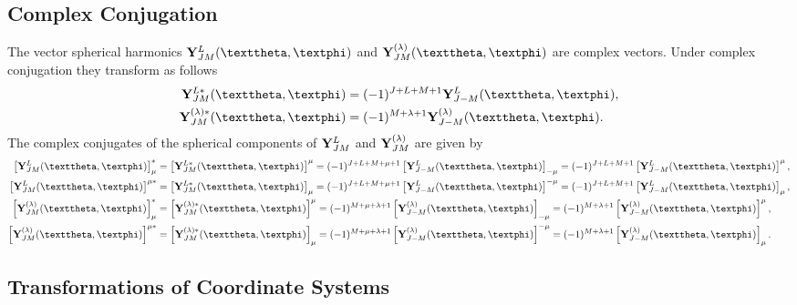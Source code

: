 \subsection{Complex Conjugation}\label{sec:7.3.3}
The vector spherical harmonics $\vect{Y}_{J M}^{L}(\vartheta, \varphi)$ and $\vect{Y}_{J M}^{(\lambda)}(\vartheta, \varphi)$ are complex vectors. Under complex conjugation they transform as follows
\begin{align}
\vect{Y}_{J M}^{L *}(\vartheta, \varphi) & =(-1)^{J+L+M+1} \vect{Y}_{J-M}^{L}(\vartheta, \varphi), \notag\\
\vect{Y}_{J M}^{(\lambda) *}(\vartheta, \varphi) & =(-1)^{M+\lambda+1} \vect{Y}_{J-M}^{(\lambda)}(\vartheta, \varphi). \label{eq:7:3:39}
\end{align}
The complex conjugates of the spherical components of $\mathbf{Y}_{J M}^{L}$ and $\mathbf{Y}_{J M}^{(\lambda)}$ are given by
\begin{align}
{\left[\vect{Y}_{J M}^{L}(\vartheta, \varphi)\right]_{\mu}^{*} } & =\left[\vect{Y}_{J M}^{L *}(\vartheta, \varphi)\right]^{\mu}=(-1)^{J+L+M+\mu+1}\left[\vect{Y}_{J-M}^{L}(\vartheta, \varphi)\right]_{-\mu}=(-1)^{J+L+M+1}\left[\vect{Y}_{J-M}^{L}(\vartheta, \varphi)\right]^{\mu}, \label{eq:7:3:40}\\
{\left[\vect{Y}_{J M}^{L}(\vartheta, \varphi)\right]^{\mu *} } & =\left[\vect{Y}_{J M}^{L *}(\vartheta, \varphi)\right]_{\mu}=(-1)^{J+L+M+\mu+1}\left[\vect{Y}_{J-M}^{L}(\vartheta, \varphi)\right]^{-\mu}=(-1)^{J+L+M+1}\left[\vect{Y}_{J-M}^{L}(\vartheta, \varphi)\right]_{\mu}, \label{eq:7:3:41}\\
{\left[\vect{Y}_{J M}^{(\lambda)}(\vartheta, \varphi)\right]_{\mu}^{*} } & =\left[\vect{Y}_{J M}^{(\lambda) *}(\vartheta, \varphi)\right]^{\mu}=(-1)^{M+\mu+\lambda+1}\left[\vect{Y}_{J-M}^{(\lambda)}(\vartheta, \varphi)\right]_{-\mu}=(-1)^{M+\lambda+1}\left[\vect{Y}_{J-M}^{(\lambda)}(\vartheta, \varphi)\right]^{\mu}, \label{eq:7:3:42}\\
{\left[\vect{Y}_{J M}^{(\lambda)}(\vartheta, \varphi)\right]^{\mu *} } & =\left[\vect{Y}_{J M}^{(\lambda) *}(\vartheta, \varphi)\right]_{\mu}=(-1)^{M+\mu+\lambda+1}\left[\vect{Y}_{J-M}^{(\lambda)}(\vartheta, \varphi)\right]^{-\mu}=(-1)^{M+\lambda+1}\left[\vect{Y}_{J-M}^{(\lambda)}(\vartheta, \varphi)\right]_{\mu}. \label{eq:7:3:43}
\end{align}
\subsection{Transformations of Coordinate Systems}\label{sec:7.3.4}
